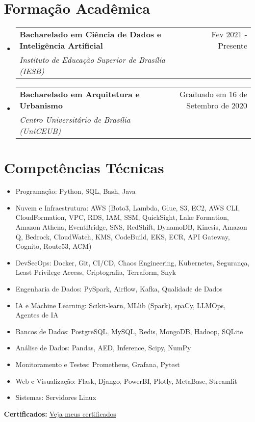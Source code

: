\documentclass[letterpaper,11pt]{article}%
\makeatletter
\newcommand{\resumeSubheading}[4]{\vspace{-1pt}\item\begin{tabular*}{0.97\textwidth}[t]{l@{\extracolsep{\fill}}r}\textbf{#1} & #2 \\\textit{\small #3} & \textit{\small #4} \\\end{tabular*}\vspace{-8pt}}%
\newcommand{\resumeSubHeadingListStart}{\begin{itemize}[leftmargin=0.15in, label={}, itemsep=0pt, parsep=0pt]}%
\newcommand{\resumeSubHeadingListEnd}{\end{itemize}}%
\newcommand{\resumeItemListStart}{\begin{itemize}[itemsep=0pt, parsep=0pt]}%
\newcommand{\resumeItemListEnd}{\end{itemize}\vspace{-1pt}}%
\makeatother
\begin{document}
%
\section*{Formação Acadêmica}%
\label{sec:FormaoAcadmica}%
\resumeSubHeadingListStart%
\resumeSubheading{Bacharelado em Ciência de Dados e Inteligência Artificial}{Fev 2021 - Presente}{Instituto de Educação Superior de Brasília (IESB)}{}%
\resumeSubHeadingListEnd%
\resumeSubHeadingListStart%
\resumeSubheading{Bacharelado em Arquitetura e Urbanismo}{Graduado em 16 de Setembro de 2020}{Centro Universitário de Brasília (UniCEUB)}{}%
\resumeSubHeadingListEnd

%
\section*{Competências Técnicas}%
\label{sec:CompetnciasTcnicas}%
\begin{multicols}{2}%
\resumeItemListStart%
\item Programação: Python, SQL, Bash, Java%
\item Nuvem e Infraestrutura: AWS (Boto3, Lambda, Glue, S3, EC2, AWS CLI, CloudFormation, VPC, RDS, IAM, SSM, QuickSight, Lake Formation, Amazon Athena, EventBridge, SNS, RedShift, DynamoDB, Kinesis, Amazon Q, Bedrock, CloudWatch, KMS, CodeBuild, EKS, ECR, API Gateway, Cognito, Route53, ACM)%
\item DevSecOps: Docker, Git, CI/CD, Chaos Engineering, Kubernetes, Segurança, Least Privilege Access, Criptografia, Terraform, Snyk%
\item Engenharia de Dados: PySpark, Airflow, Kafka, Qualidade de Dados%
\item IA e Machine Learning: Scikit-learn, MLlib (Spark), spaCy, LLMOps, Agentes de IA%
\item Bancos de Dados: PostgreSQL, MySQL, Redis, MongoDB, Hadoop, SQLite%
\item Análise de Dados: Pandas, AED, Inference, Scipy, NumPy%
\item Monitoramento e Testes: Prometheus, Grafana, Pytest%
\item Web e Visualização: Flask, Django, PowerBI, Plotly, MetaBase, Streamlit%
\item Sistemas: Servidores Linux%
\resumeItemListEnd%
\end{multicols}%
\vspace{0.5em}

%
\textbf{Certificados:} \href{https://robertomdiniz.s3.amazonaws.com/accomplishments.html}{Veja meus certificados}%
\end{document}
